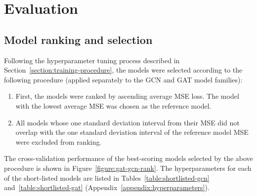 \chapter{Evaluation}
\label{chapter:evaluation}


\section{Model ranking and selection}
\label{section:model-ranking}
Following the hyperparameter tuning process described in Section~\ref{section:training-procedure}, the models were selected according to the following procedure (applied separately to the GCN and GAT model families):
\begin{enumerate}
    \item First, the models were ranked by ascending average MSE loss. The model with the lowest average MSE was chosen as the reference model.
    \item All models whose one standard deviation interval from their MSE did not overlap with the one standard deviation interval of the reference model MSE were excluded from ranking.
\end{enumerate}

The cross-validation performance of the best-scoring models selected by the above procedure is shown in Figure~\ref{figure:gat-gcn-rank}. The hyperparameters for each of the short-listed models are listed in Tables~\ref{table:shortlisted-gcn} and~\ref{table:shortlisted-gat} (Appendix~\ref{appendix:hyperparameters}).

